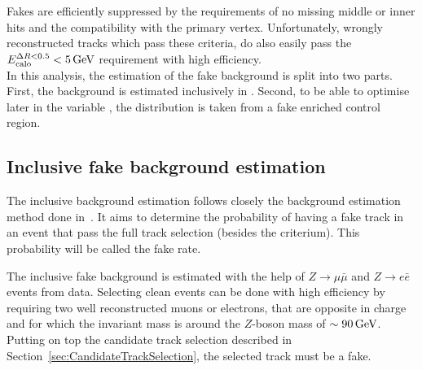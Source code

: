 Fakes are efficiently suppressed by the requirements of no missing middle or inner hits and the compatibility with the primary vertex.
Unfortunately, wrongly reconstructed tracks which pass these criteria, do also easily pass the $E^{\Delta R<0.5}_{\text{calo}}<5\,\text{Ge}\kern-0.06667em\text{V}$ requirement with high efficiency.\\

In this analysis, the estimation of the fake background is split into two parts.
First, the background is estimated inclusively in \ias.
Second, to be able to optimise later in the variable \ias, the \ias distribution is taken from a fake enriched control region.

\subsection*{Inclusive fake background estimation}
The inclusive background estimation follows closely the background estimation method done in~\cite{bib:CMS:DT_Thesis,bib:CMS:DT_8TeV_AN}.
It aims to determine the probability of having a fake track in an event that pass the full track selection (besides the \ias criterium).
This probability will be called the fake rate.

The inclusive fake background is estimated with the help of $Z\rightarrow\mu\bar{\mu}$ and $Z\rightarrow e\bar{e}$ events from data.
Selecting clean \Zlep events can be done with high efficiency by requiring two well reconstructed muons or electrons, that are opposite in charge and for which the invariant mass is around the $Z$-boson mass of $\sim90\,\text{Ge}\kern-0.06667em\text{V}$.
Putting on top the candidate track selection described in Section~\ref{sec:CandidateTrackSelection}, the selected track must be a fake.

